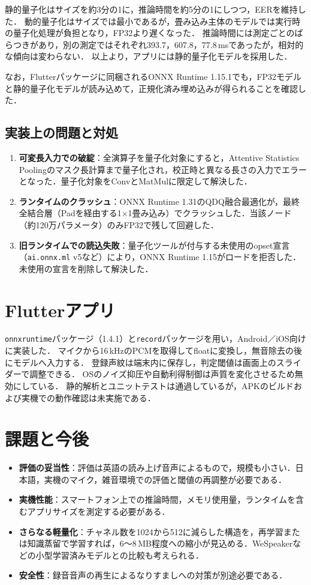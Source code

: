 \documentclass[paper=a4paper,fontsize=10.5pt]{jlreq}
\begin{document}
静的量子化はサイズを約3分の1に，推論時間を約5分の1にしつつ，EERを維持した．
動的量子化はサイズでは最小であるが，畳み込み主体のモデルでは実行時の量子化処理が負担となり，FP32より遅くなった．
推論時間には測定ごとのばらつきがあり，別の測定ではそれぞれ393.7，607.8，77.8\,msであったが，相対的な傾向は変わらない．
以上より，アプリには静的量子化モデルを採用した．

なお，Flutterパッケージに同梱されるONNX Runtime 1.15.1でも，FP32モデルと静的量子化モデルが読み込めて，正規化済み埋め込みが得られることを確認した．

\subsection{実装上の問題と対処}
\begin{enumerate}
  \item \textbf{可変長入力での破綻}：全演算子を量子化対象にすると，Attentive Statistics Poolingのマスク長計算まで量子化され，校正時と異なる長さの入力でエラーとなった．量子化対象をConvとMatMulに限定して解決した．
  \item \textbf{ランタイムのクラッシュ}：ONNX Runtime 1.31のQDQ融合最適化が，最終全結合層（Padを経由する1×1畳み込み）でクラッシュした．当該ノード（約120万パラメータ）のみFP32で残して回避した．
  \item \textbf{旧ランタイムでの読込失敗}：量子化ツールが付与する未使用のopset宣言（\texttt{ai.onnx.ml} v5など）により，ONNX Runtime 1.15がロードを拒否した．未使用の宣言を削除して解決した．
\end{enumerate}

\section{Flutterアプリ}
\texttt{onnxruntime}パッケージ（1.4.1）と\texttt{record}パッケージを用い，Android／iOS向けに実装した．
マイクから16\,kHzのPCMを取得してfloatに変換し，無音除去の後にモデルへ入力する．
登録声紋は端末内に保存し，判定閾値は画面上のスライダーで調整できる．
OSのノイズ抑圧や自動利得制御は声質を変化させるため無効にしている．
静的解析とユニットテストは通過しているが，APKのビルドおよび実機での動作確認は未実施である．

\section{課題と今後}
\begin{itemize}
  \item \textbf{評価の妥当性}：評価は英語の読み上げ音声によるもので，規模も小さい．日本語，実機のマイク，雑音環境での評価と閾値の再調整が必要である．
  \item \textbf{実機性能}：スマートフォン上での推論時間，メモリ使用量，ランタイムを含むアプリサイズを測定する必要がある．
  \item \textbf{さらなる軽量化}：チャネル数を1024から512に減らした構造を，再学習または知識蒸留で学習すれば，6〜8\,MB程度への縮小が見込める．WeSpeakerなどの小型学習済みモデルとの比較も考えられる．
  \item \textbf{安全性}：録音音声の再生によるなりすましへの対策が別途必要である．
\end{itemize}
\end{document}
